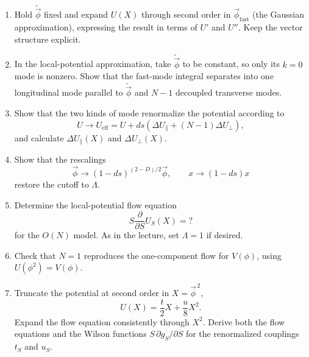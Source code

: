 \begin{enumerate}[label=\alph*)]
    \item Hold $\widetilde{\vec\phi}$ fixed and expand $U(X)$ through second
    order in $\vec\phi_{\mathrm{fast}}$ (the Gaussian approximation), expressing
    the result in terms of $U'$ and $U''$. Keep the vector structure explicit.

    \item In the local-potential approximation, take
    $\widetilde{\vec\phi}$ to be constant, so only its $k=0$ mode is nonzero.
    Show that the fast-mode integral separates into one longitudinal mode parallel
    to $\widetilde{\vec\phi}$ and $N-1$ decoupled transverse modes.

    \item Show that the two kinds of mode renormalize the potential according to
    \begin{equation}
        U\longrightarrow U_{\mathrm{eff}}
        =U+ds\left(
            \Delta U_{\parallel}
            +(N-1)\Delta U_{\perp}
        \right),
    \end{equation}
    and calculate $\Delta U_{\parallel}(X)$ and $\Delta U_{\perp}(X)$.

    \item Show that the rescalings
    \begin{equation}
        \vec\phi\longrightarrow
        (1-ds)^{(2-D)/2}\vec\phi,
        \qquad
        x\longrightarrow(1-ds)x
    \end{equation}
    restore the cutoff to $\Lambda$.

    \item Determine the local-potential flow equation
    \begin{equation}
        S\frac{\partial}{\partial S}U_S(X)=?
    \end{equation}
    for the $O(N)$ model. As in the lecture, set $\Lambda=1$ if desired.

    \item Check that $N=1$ reproduces the one-component flow for $V(\phi)$,
    using $U(\phi^2)=V(\phi)$.

    \item Truncate the potential at second order in $X=\vec\phi^{\,2}$,
    \begin{equation}
        U(X)=\frac{t}{2}X+\frac{u}{8}X^2.
    \end{equation}
    Expand the flow equation consistently through $X^2$. Derive both the flow
    equations and the Wilson functions $S\,\partial g_S/\partial S$ for the
    renormalized couplings $t_S$ and $u_S$.
\end{enumerate}
